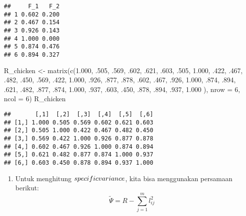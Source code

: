 \documentclass[
]{article}
\newenvironment{Shaded}{\begin{snugshade}}{\end{snugshade}}
\newcommand{\AttributeTok}[1]{\textcolor[rgb]{0.77,0.63,0.00}{#1}}
\newcommand{\DecValTok}[1]{\textcolor[rgb]{0.00,0.00,0.81}{#1}}
\newcommand{\FloatTok}[1]{\textcolor[rgb]{0.00,0.00,0.81}{#1}}
\newcommand{\FunctionTok}[1]{\textcolor[rgb]{0.00,0.00,0.00}{#1}}
\newcommand{\NormalTok}[1]{#1}
\newcommand{\OtherTok}[1]{\textcolor[rgb]{0.56,0.35,0.01}{#1}}
\providecommand{\tightlist}{%
  \setlength{\itemsep}{0pt}\setlength{\parskip}{0pt}}
\begin{document}
\begin{verbatim}
##     F_1   F_2
## 1 0.602 0.200
## 2 0.467 0.154
## 3 0.926 0.143
## 4 1.000 0.000
## 5 0.874 0.476
## 6 0.894 0.327
\end{verbatim}

\begin{Shaded}
\begin{Highlighting}[]
\NormalTok{R\_chicken }\OtherTok{\textless{}{-}} \FunctionTok{matrix}\NormalTok{(}\FunctionTok{c}\NormalTok{(}\FloatTok{1.000}\NormalTok{, .}\DecValTok{505}\NormalTok{, .}\DecValTok{569}\NormalTok{, .}\DecValTok{602}\NormalTok{, .}\DecValTok{621}\NormalTok{, .}\DecValTok{603}\NormalTok{,}
\NormalTok{              .}\DecValTok{505}\NormalTok{, }\FloatTok{1.000}\NormalTok{, .}\DecValTok{422}\NormalTok{, .}\DecValTok{467}\NormalTok{, .}\DecValTok{482}\NormalTok{, .}\DecValTok{450}\NormalTok{,}
\NormalTok{              .}\DecValTok{569}\NormalTok{, .}\DecValTok{422}\NormalTok{, }\FloatTok{1.000}\NormalTok{, .}\DecValTok{926}\NormalTok{, .}\DecValTok{877}\NormalTok{, .}\DecValTok{878}\NormalTok{,}
\NormalTok{              .}\DecValTok{602}\NormalTok{, .}\DecValTok{467}\NormalTok{, .}\DecValTok{926}\NormalTok{, }\FloatTok{1.000}\NormalTok{, .}\DecValTok{874}\NormalTok{, .}\DecValTok{894}\NormalTok{,}
\NormalTok{              .}\DecValTok{621}\NormalTok{, .}\DecValTok{482}\NormalTok{, .}\DecValTok{877}\NormalTok{, .}\DecValTok{874}\NormalTok{, }\FloatTok{1.000}\NormalTok{, .}\DecValTok{937}\NormalTok{,}
\NormalTok{              .}\DecValTok{603}\NormalTok{, .}\DecValTok{450}\NormalTok{, .}\DecValTok{878}\NormalTok{, .}\DecValTok{894}\NormalTok{, .}\DecValTok{937}\NormalTok{, }\FloatTok{1.000}
\NormalTok{              ), }\AttributeTok{nrow =} \DecValTok{6}\NormalTok{, }\AttributeTok{ncol =} \DecValTok{6}\NormalTok{)}
\NormalTok{R\_chicken}
\end{Highlighting}
\end{Shaded}

\begin{verbatim}
##       [,1]  [,2]  [,3]  [,4]  [,5]  [,6]
## [1,] 1.000 0.505 0.569 0.602 0.621 0.603
## [2,] 0.505 1.000 0.422 0.467 0.482 0.450
## [3,] 0.569 0.422 1.000 0.926 0.877 0.878
## [4,] 0.602 0.467 0.926 1.000 0.874 0.894
## [5,] 0.621 0.482 0.877 0.874 1.000 0.937
## [6,] 0.603 0.450 0.878 0.894 0.937 1.000
\end{verbatim}

\begin{enumerate}
\def\labelenumi{\alph{enumi}.}
\tightlist
\item
  Untuk menghitung \(specific \space variance\), kita bisa menggunakan
  persamaan berikut: \[\tilde{\Psi} = R - \sum_{j=1}^{m} l_{ij}^{2}\]
\end{enumerate}
\end{document}
